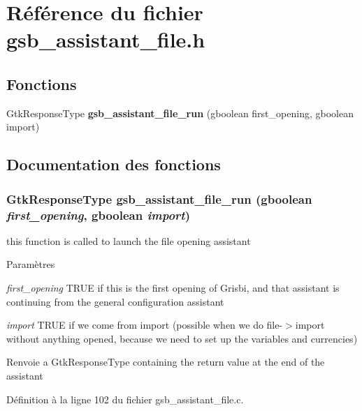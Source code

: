 \section{Référence du fichier gsb\_\-assistant\_\-file.h}
\label{gsb__assistant__file_8h}
\subsection*{Fonctions}
\begin{DoxyCompactItemize}
\item 
GtkResponseType {\bf gsb\_\-assistant\_\-file\_\-run} (gboolean first\_\-opening, gboolean import)
\end{DoxyCompactItemize}


\subsection{Documentation des fonctions}
\subsubsection[{gsb\_\-assistant\_\-file\_\-run}]{\setlength{\rightskip}{0pt plus 5cm}GtkResponseType gsb\_\-assistant\_\-file\_\-run (gboolean {\em first\_\-opening}, \/  gboolean {\em import})}\label{gsb__assistant__file_8h_aae9dc6c606124740c2518604c2b77685}
this function is called to launch the file opening assistant


\begin{DoxyParams}{Paramètres}
\item[{\em first\_\-opening}]TRUE if this is the first opening of Grisbi, and that assistant is continuing from the general configuration assistant \item[{\em import}]TRUE if we come from import (possible when we do file-\/$>$import without anything opened, because we need to set up the variables and currencies)\end{DoxyParams}
\begin{DoxyReturn}{Renvoie}
a GtkResponseType containing the return value at the end of the assistant 
\end{DoxyReturn}


Définition à la ligne 102 du fichier gsb\_\-assistant\_\-file.c.

